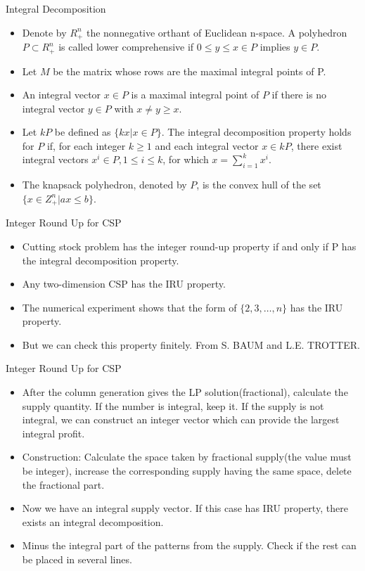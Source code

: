     \begin{frame}{Integral Decomposition}
      \begin{itemize}
        \item Denote by $R_+^n$ the nonnegative orthant of Euclidean n-space. A polyhedron $P \subset R_+^n$ is called lower comprehensive if $0 \leq y \leq x \in P$ implies $y \in P$.
        \item Let $M$ be the matrix whose rows are the maximal integral points of P.
        \item An integral vector $x \in P$ is a maximal integral point of $P$ if there is no integral vector $y \in P$ with $x \neq y \geq x$.
        \item Let $kP$ be defined as $\{kx|x \in P\}$.
        The integral decomposition property holds for
        $P$ if, for each integer $k \geq 1$ and each integral vector $x \in kP$, there exist integral vectors $x^i \in P, 1 \leq i \leq k$, for which $x = \sum_{i=1}^k x^i$.
        \item The knapsack polyhedron, denoted by $P$, is the convex hull of the set $\{x \in Z_+^n|ax \leq b\}$.
      \end{itemize}
    \end{frame}

    \begin{frame}{Integer Round Up for CSP}
      \begin{itemize}
        \item Cutting stock problem has the integer round-up property if and only if P has the integral decomposition property.
        \item Any two-dimension CSP has the IRU property.
        \item The numerical experiment shows that the form of $\{2,3,\ldots,n\}$ has the IRU property.
        \item But we can check this property finitely. From S. BAUM and L.E. TROTTER.
      \end{itemize}
    \end{frame}

    \begin{frame}{Integer Round Up for CSP}
      \begin{itemize}
        \item After the column generation gives the LP solution(fractional), calculate the supply quantity. If the number is integral, keep it.
        If the supply is not integral, we can construct an integer vector which can provide the largest integral profit.
        \item Construction: Calculate the space taken by fractional supply(the value must be integer), increase the corresponding supply having the same space, delete the fractional part.
        \item Now we have an integral supply vector. If this case has IRU property, there exists an integral decomposition.
        \item Minus the integral part of the patterns from the supply. Check if the rest can be placed in several lines.
      \end{itemize}
    \end{frame}

